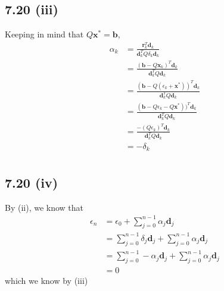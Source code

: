 \documentclass[letterpaper,12pt]{article}
\theoremstyle{definition}
\begin{document}
\subsection*{7.20 (iii)}
            
            
			Keeping in mind that $Q\textbf{x}^*=\textbf{b}$,
			\begin{align*}
				\alpha_k &= \frac{\textbf{r}_k^T \textbf{d}_k}{\textbf{d}_k^T Q\delta_k\textbf{d}_k} \\&= \frac{(\textbf{b}-Q\textbf{x}_k)^T \textbf{d}_k}{\textbf{d}_k^T Q\textbf{d}_k}\\
				&= \frac{(\textbf{b}-Q(\epsilon_k+ \textbf{x}^*))^T \textbf{d}_k}{\textbf{d}_k^T Q\textbf{d}_k}\\
				&= \frac{(\textbf{b}-Q\epsilon_k- Q\textbf{x}^*))^T \textbf{d}_k}{\textbf{d}_k^T Q\textbf{d}_k}\\
				&= \frac{-(Q\epsilon_k)^T \textbf{d}_k}{\textbf{d}_k^T Q\textbf{d}_k}\\&= -\delta_k\\
			\end{align*}


\subsection*{7.20 (iv)}

By (ii), we know that
			\begin{align*}
				\epsilon_n	&= \epsilon_0 + \displaystyle\sum_{j=0}^{n-1}\alpha_j\textbf{d}_j		\\
							&= \displaystyle\sum_{j=0}^{n-1}\delta_j\textbf{d}_j + \displaystyle\sum_{j=0}^{n-1}\alpha_j\textbf{d}_j\\
							&= \displaystyle\sum_{j=0}^{n-1}-\alpha_j\textbf{d}_j + \displaystyle\sum_{j=0}^{n-1}\alpha_j\textbf{d}_j \\&= 0
			\end{align*}
            which we know by (iii)
\end{document}
